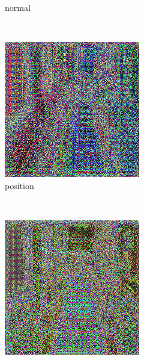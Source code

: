 \begin{figure}[h!]
\begin{subfigure}[b]{0.175\textwidth}
     \caption{normal}
    \end{subfigure}
    ~
    \begin{subfigure}[b]{0.175\textwidth}
     \includegraphics[width=\textwidth]{figures/result/single/position/2.png}
     \caption{position}
    \end{subfigure}
    ~
    \begin{subfigure}[b]{0.175\textwidth}
     \includegraphics[width=\textwidth]{figures/result/single/roughness/2.png}

\end{subfigure}
\end{figure}
